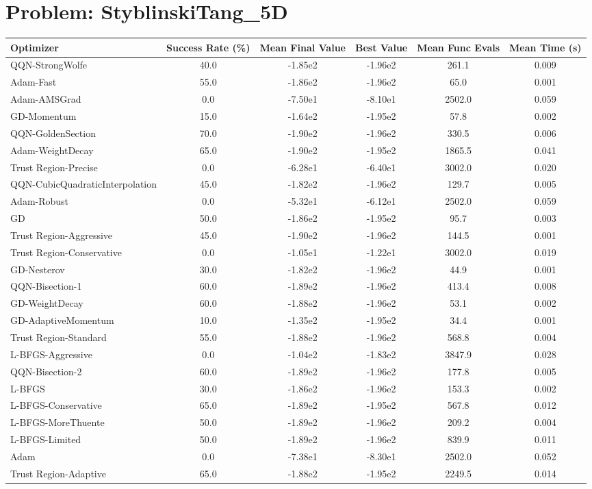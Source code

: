 \documentclass{article}
\begin{document}
\section{Problem: StyblinskiTang\_5D}
\begin{longtable}{p{3cm}*{5}{c}}
\toprule
\textbf{Optimizer} & \textbf{Success Rate (\%)} & \textbf{Mean Final Value} & \textbf{Best Value} & \textbf{Mean Func Evals} & \textbf{Mean Time (s)} \\
\midrule
QQN-StrongWolfe & 40.0 & -1.85e2 & -1.96e2 & 261.1 & 0.009 \\
Adam-Fast & 55.0 & -1.86e2 & -1.96e2 & 65.0 & 0.001 \\
Adam-AMSGrad & 0.0 & -7.50e1 & -8.10e1 & 2502.0 & 0.059 \\
GD-Momentum & 15.0 & -1.64e2 & -1.95e2 & 57.8 & 0.002 \\
QQN-GoldenSection & 70.0 & -1.90e2 & -1.96e2 & 330.5 & 0.006 \\
Adam-WeightDecay & 65.0 & -1.90e2 & -1.95e2 & 1865.5 & 0.041 \\
Trust Region-Precise & 0.0 & -6.28e1 & -6.40e1 & 3002.0 & 0.020 \\
QQN-CubicQuadraticInterpolation & 45.0 & -1.82e2 & -1.96e2 & 129.7 & 0.005 \\
Adam-Robust & 0.0 & -5.32e1 & -6.12e1 & 2502.0 & 0.059 \\
GD & 50.0 & -1.86e2 & -1.95e2 & 95.7 & 0.003 \\
Trust Region-Aggressive & 45.0 & -1.90e2 & -1.96e2 & 144.5 & 0.001 \\
Trust Region-Conservative & 0.0 & -1.05e1 & -1.22e1 & 3002.0 & 0.019 \\
GD-Nesterov & 30.0 & -1.82e2 & -1.96e2 & 44.9 & 0.001 \\
QQN-Bisection-1 & 60.0 & -1.89e2 & -1.96e2 & 413.4 & 0.008 \\
GD-WeightDecay & 60.0 & -1.88e2 & -1.96e2 & 53.1 & 0.002 \\
GD-AdaptiveMomentum & 10.0 & -1.35e2 & -1.95e2 & 34.4 & 0.001 \\
Trust Region-Standard & 55.0 & -1.88e2 & -1.96e2 & 568.8 & 0.004 \\
L-BFGS-Aggressive & 0.0 & -1.04e2 & -1.83e2 & 3847.9 & 0.028 \\
QQN-Bisection-2 & 60.0 & -1.89e2 & -1.96e2 & 177.8 & 0.005 \\
L-BFGS & 30.0 & -1.86e2 & -1.96e2 & 153.3 & 0.002 \\
L-BFGS-Conservative & 65.0 & -1.89e2 & -1.95e2 & 567.8 & 0.012 \\
L-BFGS-MoreThuente & 50.0 & -1.89e2 & -1.96e2 & 209.2 & 0.004 \\
L-BFGS-Limited & 50.0 & -1.89e2 & -1.96e2 & 839.9 & 0.011 \\
Adam & 0.0 & -7.38e1 & -8.30e1 & 2502.0 & 0.052 \\
Trust Region-Adaptive & 65.0 & -1.88e2 & -1.95e2 & 2249.5 & 0.014 \\
\bottomrule
\end{longtable}
\end{document}
